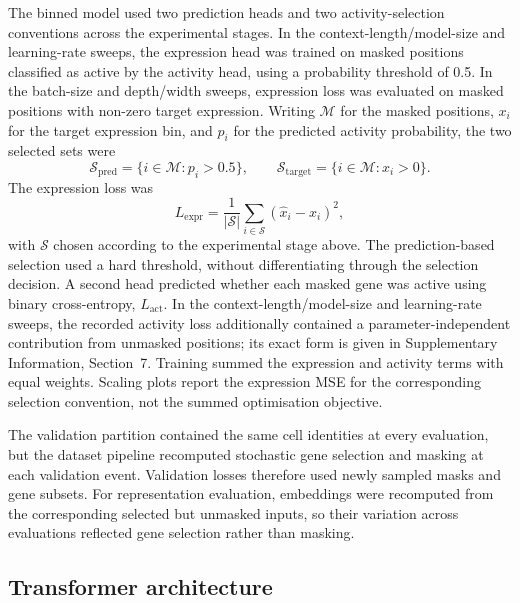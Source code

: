 \documentclass[pdflatex,sn-nature]{sn-jnl}%
\theoremstyle{thmstyleone}%
\theoremstyle{thmstyletwo}%
\theoremstyle{thmstylethree}%
\begin{document}
The binned model used two prediction heads and two activity-selection conventions across the experimental stages.
In the context-length/model-size and learning-rate sweeps, the expression head was trained on masked positions classified as active by the activity head, using a probability threshold of 0.5.
In the batch-size and depth/width sweeps, expression loss was evaluated on masked positions with non-zero target expression.
Writing $\mathcal{M}$ for the masked positions, $x_i$ for the target expression bin, and $p_i$ for the predicted activity probability, the two selected sets were
\begin{equation}
    \mathcal{S}_{\mathrm{pred}}=\{i\in\mathcal{M}:p_i>0.5\},
    \qquad
    \mathcal{S}_{\mathrm{target}}=\{i\in\mathcal{M}:x_i>0\}.
\end{equation}
The expression loss was
\begin{equation}
    L_{\mathrm{expr}}
    = \frac{1}{|\mathcal{S}|}
      \sum_{i\in\mathcal{S}}{(\hat{x}_i-x_i)}^2,
\end{equation}
with $\mathcal{S}$ chosen according to the experimental stage above.
The prediction-based selection used a hard threshold, without differentiating through the selection decision.
A second head predicted whether each masked gene was active using binary cross-entropy, $L_{\mathrm{act}}$.
In the context-length/model-size and learning-rate sweeps, the recorded activity loss additionally contained a parameter-independent contribution from unmasked positions; its exact form is given in Supplementary Information, Section~7.
Training summed the expression and activity terms with equal weights.
Scaling plots report the expression MSE for the corresponding selection convention, not the summed optimisation objective.

The validation partition contained the same cell identities at every evaluation, but the dataset pipeline recomputed stochastic gene selection and masking at each validation event.
Validation losses therefore used newly sampled masks and gene subsets.
For representation evaluation, embeddings were recomputed from the corresponding selected but unmasked inputs, so their variation across evaluations reflected gene selection rather than masking.

\subsection{Transformer architecture}
\end{document}
